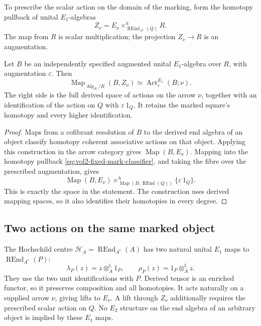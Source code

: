 To prescribe the scalar action on the domain of the marking,
form the homotopy pullback of unital \(E_1\)-algebras
\begin{equation}\label{eq:vol2-fixed-mark-classifier}
 Z_\nu=E_\nu\times^h_{\operatorname{REnd}_{A^e}(Q)}R.
\end{equation}
The map from \(R\) is scalar multiplication; the projection
\(Z_\nu\to R\) is an augmentation.

\begin{theorem}\label{thm:vol2-fixed-mark-classifier}
Let \(B\) be an independently specified augmented unital
\(E_1\)-algebra over \(R\), with augmentation \(\varepsilon\).
Then
\[
 \operatorname{Map}_{\operatorname{Alg}_R/R}(B,Z_\nu)
 \simeq \operatorname{Act}^{E_1}_{\varepsilon}(B;\nu).
\]
The right side is the full derived space of actions on the
arrow \(\nu\), together with an identification of the action
on \(Q\) with \(\varepsilon\,1_Q\). It retains the marked
square's homotopy and every higher identification.
\end{theorem}
\begin{proof}
Maps from a cofibrant resolution of \(B\) to the derived end
algebra of an object classify homotopy coherent associative
actions on that object. Applying this construction in the
arrow category gives \(\operatorname{Map}(B,E_\nu)\).
Mapping into the homotopy pullback
\eqref{eq:vol2-fixed-mark-classifier}, and taking the fibre over
the prescribed augmentation, gives
\[
 \operatorname{Map}(B,E_\nu)
 \times^h_{\operatorname{Map}(B,\operatorname{REnd}(Q))}
 \{\varepsilon\,1_Q\}.
\]
This is exactly the space in the statement. The construction
uses derived mapping spaces, so it also identifies their
homotopies in every degree.
\end{proof}

\subsection{Two actions on the same marked object}

The Hochschild centre
\(\mathcal H_A=\operatorname{REnd}_{A^e}(A)\) has two
natural unital \(E_1\) maps to
\(\operatorname{REnd}_{A^e}(P)\):
\begin{equation}\label{eq:vol2-two-tensor-actions}
 \lambda_P(z)=z\otimes_A^{\mathbb L}1_P,\qquad
 \rho_P(z)=1_P\otimes_A^{\mathbb L}z.
\end{equation}
They use the two unit identifications with \(P\).
Derived tensor is an enriched functor, so it preserves
composition and all homotopies. It acts naturally on a supplied
arrow \(\nu\), giving lifts to \(E_\nu\). A lift through
\(Z_\nu\) additionally requires the prescribed scalar action
on \(Q\). No \(E_2\) structure on the end algebra of an arbitrary
object is implied by these \(E_1\) maps.

